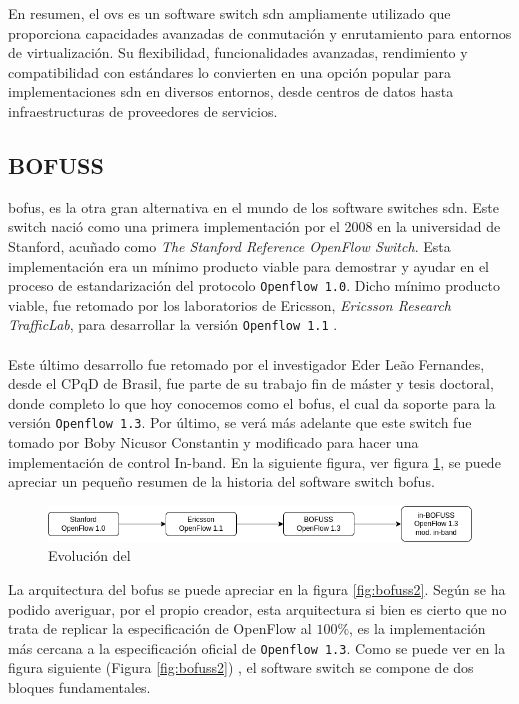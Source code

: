 En resumen, el \gls{ovs} es un software switch \gls{sdn} ampliamente utilizado que proporciona capacidades avanzadas de conmutación y enrutamiento para entornos de virtualización. Su flexibilidad, funcionalidades avanzadas, rendimiento y compatibilidad con estándares lo convierten en una opción popular para implementaciones \gls{sdn} en diversos entornos, desde centros de datos hasta infraestructuras de proveedores de servicios.


\subsection{BOFUSS}
\label{subsec:BOFUSS}

\gls{bofus}, es la otra gran alternativa en el mundo de los software switches \gls{sdn}. Este switch nació como una primera implementación por el 2008 en la universidad de Stanford, acuñado como  \textit{The Stanford Reference OpenFlow Switch}. Esta implementación era un mínimo producto viable para demostrar y ayudar en el proceso de estandarización del protocolo \texttt{Openflow 1.0}. Dicho mínimo producto viable, fue retomado por los laboratorios de Ericsson, \textit{Ericsson Research TrafficLab}, para desarrollar la versión \texttt{Openflow 1.1} \cite{fernandes2020road}. \\
\\
Este último desarrollo fue retomado por el investigador Eder Leão Fernandes, desde el CPqD de Brasil, fue parte de su trabajo fin de máster y tesis doctoral, donde completo lo que hoy conocemos como el \gls{bofus}, el cual da soporte para la versión \texttt{Openflow 1.3}. Por último, se verá más adelante que este switch fue tomado por Boby Nicusor Constantin y modificado para hacer una implementación de control In-band. En la siguiente figura, ver figura \ref{fig:bofuss1}, se puede apreciar un pequeño resumen de la historia del software switch \gls{bofus}.

\begin{figure}[ht]
    \centering
    \includegraphics[width=\textwidth]{archivos/img/teoria/bofuss1.png}
    \caption{Evolución del }
    \label{fig:bofuss1}
\end{figure}

La arquitectura del \gls{bofus} se puede apreciar en la figura \ref{fig:bofuss2}. Según se ha podido averiguar, por el propio creador, esta arquitectura si bien es cierto que no trata de replicar la especificación de OpenFlow al $100\%$, es la implementación más cercana a la especificación oficial de \texttt{Openflow 1.3}. Como se puede ver en la figura siguiente (Figura \ref{fig:bofuss2}) , el software switch se compone de dos bloques fundamentales.

